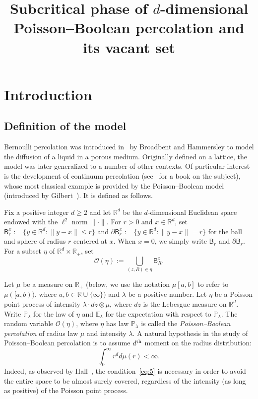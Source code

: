 \documentclass[AHL,Unicode,longabstracts]{cedram}
\title[Subcritical phase of $d$-dimensional Poisson--Boolean percolation]{Subcritical phase of $d$-dimensional Poisson--Boolean percolation and its vacant set}
\author{\firstname{Hugo} \lastname{Duminil-Copin}}
\author{\firstname{Aran} \lastname{Raoufi}}
\author{\firstname{Vincent} \lastname{Tassion}}
\begin{document}
\maketitle



\section{Introduction}

\subsection{Definition of the model}
Bernoulli percolation was introduced in~\cite{BroHam57} by Broadbent and Hammersley to model the diffusion of a liquid in a porous medium. Originally defined on a lattice, the model was later generalized to a number of other contexts. Of particular interest is the development of continuum percolation (see~\cite{MeeRoy08} for a book on the subject), whose most classical example is provided by the Poisson--Boolean model (introduced by Gilbert~\cite{Gil}). It is defined as follows.

Fix a positive integer $d\ge2$ and let ${\mathbb R}^d$ be the $d$-dimensional Euclidean space endowed with the $\ell^2$ norm $\|\cdot\|$. For $r>0$ and $x\in{\mathbb R}^d$, set $\mathsf B_r^x:=\{y\in{\mathbb R}^d:\|y-x\|\le r\}$ and $\partial\mathsf B_r^x:=\{y\in {\mathbb R}^d:\|y-x\|=r\}$ for the ball and sphere of radius $r$ centered at $x$. When $x=0$, we simply write $\mathsf B_r$ and $\partial\mathsf B_r$. For a subset $\eta$ of ${\mathbb R}^d\times{\mathbb R}_+$, set
\[
{\mathcal O}(\eta):=\bigcup_{(z,R)\in\eta} \mathsf B_R^z.
\]

Let $ \mu$ be a measure on ${\mathbb R}_+$ (below, we use the notation $\mu[a,b]$ to refer to $\mu([a,b))$, where $a,b\in{\mathbb R}\cup\{\infty\}$) and $\lambda$ be a positive number. Let $\eta$ be a Poisson point process of intensity $ \lambda \cdot dz\otimes \mu$, where $dz$ is the Lebesgue measure on ${\mathbb R}^d$. Write ${\mathbb P}_\lambda$ for the law of $\eta$ and ${\mathbb E}_\lambda$ for the expectation with respect to ${\mathbb P}_\lambda$. The random variable ${\mathcal O}(\eta)$, where $\eta$ has law ${\mathbb P}_\lambda$ is called the \emph{Poisson--Boolean percolation} of radius law $\mu$ and intensity $\lambda$. A natural hypothesis in the study of Poisson--Boolean percolation is to assume $d^{\rm th}$ moment on the radius distribution:
\begin{equation}\label{eq:5}
\int_0^\infty r^d d\mu(r) <\infty.
\end{equation}
Indeed, as observed by Hall~\cite{Hal}, the condition~\eqref{eq:5} is necessary in order to avoid the entire space to be almost surely covered, regardless of the intensity (as long as positive) of the Poisson point process.
\end{document}
